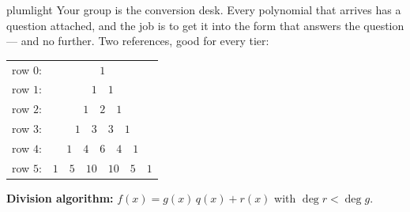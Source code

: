 \documentclass[10pt]{article}
\begin{document}

\vspace{0.12in}

\begin{scenariobox}{plumlight}
\small
Your group is the conversion desk. Every polynomial that arrives has a
question attached, and the job is to get it into the form that answers the
question --- and no further. Two references, good for every tier:

\smallskip
\begin{center}
\renewcommand{\arraystretch}{1.1}
\begin{tabular}{r c}
row $0$: & $1$ \\
row $1$: & $1 \quad 1$ \\
row $2$: & $1 \quad 2 \quad 1$ \\
row $3$: & $1 \quad 3 \quad 3 \quad 1$ \\
row $4$: & $1 \quad 4 \quad 6 \quad 4 \quad 1$ \\
row $5$: & $1 \quad 5 \quad 10 \quad 10 \quad 5 \quad 1$ \\
\end{tabular}
\end{center}

\smallskip
\textbf{Division algorithm:} $f(x) = g(x)\,q(x) + r(x)$ with
$\deg r < \deg g$.
\end{scenariobox}

\vspace{0.1in}
\end{document}
